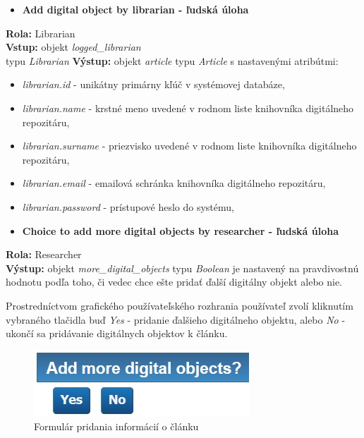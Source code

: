 \documentclass[10pt,oneside,slovak,a4paper]{article}
\begin{document}
\begin{itemize}
\item \textbf{Add digital object by librarian - ľudská úloha}
\end{itemize}

\textbf{Rola:} Librarian\\
\textbf{Vstup:} objekt \textit{logged\_librarian}\\ typu \textit{Librarian}
\textbf{Výstup:} objekt \textit{article} typu \textit{Article} s nastavenými atribútmi:

\begin{itemize}
\item \textit{librarian.id} - unikátny primárny kľúč v systémovej databáze,
\item \textit{librarian.name} - krstné meno uvedené v rodnom liste knihovníka digitálneho repozitáru,
\item \textit{librarian.surname} -  priezvisko uvedené v rodnom liste knihovníka digitálneho repozitáru,
\item \textit{librarian.email} - emailová schránka knihovníka digitálneho repozitáru,
\item \textit{librarian.password} - prístupové heslo do systému,
\end{itemize}

\begin{itemize}
\item \textbf{Choice to add more digital objects by researcher
 - ľudská úloha}
\end{itemize}

\textbf{Rola:} Researcher\\
\textbf{Výstup:} objekt \textit{more\_digital\_objects} typu \textit{Boolean} je nastavený na pravdivostnú hodnotu podľa toho, či vedec chce ešte pridať ďalší digitálny objekt alebo nie.

Prostredníctvom grafického používateľského rozhrania používateľ zvolí kliknutím vybraného tlačidla buď \textit{Yes} - pridanie ďalšieho digitálneho objektu, alebo \textit{No} - ukončí sa pridávanie digitálnych objektov k článku.

\begin{figure} [H]
\centering
\includegraphics[scale=0.4]{forms/formDigitalObjects.jpg} 
\caption{Formulár pridania informácií o článku}
\end{figure}
\end{document}
